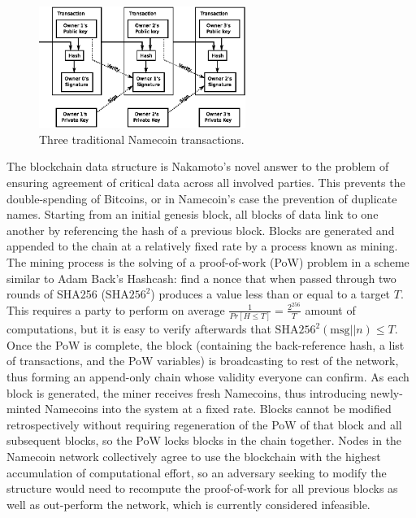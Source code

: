 \begin{figure}[htbp]
	\centering
	\includegraphics[width=0.6\textwidth]{images/bitcoin_transaction.eps}
	\caption{Three traditional Namecoin transactions.}
	\label{fig:figure7}
\end{figure}

The blockchain data structure is Nakamoto's novel answer to the problem of ensuring agreement of critical data across all involved parties. This prevents the double-spending of Bitcoins, or in Namecoin's case the prevention of duplicate names. Starting from an initial genesis block, all blocks of data link to one another by referencing the hash of a previous block. Blocks are generated and appended to the chain at a relatively fixed rate by a process known as mining. The mining process is the solving of a proof-of-work (PoW) problem in a scheme similar to Adam Back's Hashcash: find a nonce that when passed through two rounds of SHA256 ($ \textrm{SHA}256^{{2}} $) produces a value less than or equal to a target $ T $. This requires a party to perform on average $ \frac{1}{Pr[H \leq T]} = \frac{2 ^ {{256}}}{T} $ amount of computations, but it is easy to verify afterwards that $ \textrm{SHA}256^{{2}}(\textrm{msg} || n) \leq T $. Once the PoW is complete, the block (containing the back-reference hash, a list of transactions, and the PoW variables) is broadcasting to rest of the network, thus forming an append-only chain whose validity everyone can confirm. As each block is generated, the miner receives fresh Namecoins, thus introducing newly-minted Namecoins into the system at a fixed rate. Blocks cannot be modified retrospectively without requiring regeneration of the PoW of that block and all subsequent blocks, so the PoW locks blocks in the chain together. Nodes in the Namecoin network collectively agree to use the blockchain with the highest accumulation of computational effort, so an adversary seeking to modify the structure would need to recompute the proof-of-work for all previous blocks as well as out-perform the network, which is currently considered infeasible.\cite{Okupski2014}

